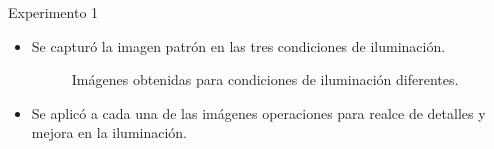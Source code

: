  \begin{frame}{Experimento 1}
   \begin{itemize}
  \item Se capturó la imagen patrón en las tres condiciones de iluminación.
      \begin{figure}[H]
      \centering
      \caption*{Imágenes obtenidas para condiciones de iluminación diferentes.}
      \label{fig:prueba_iluminacion_realce_detalles_2_imagenes}
    \end{figure}
  \item Se aplicó a cada una de las imágenes operaciones para realce de detalles y mejora en la iluminación.
 \end{itemize}
  \end{frame}
  
  

